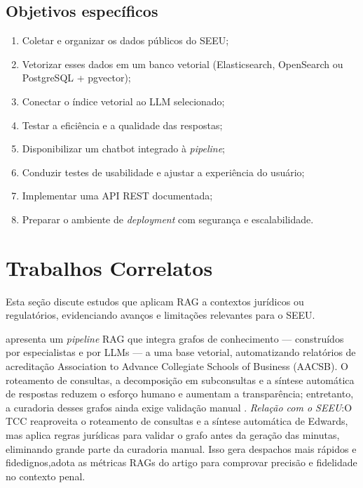 \subsection{Objetivos específicos}
\begin{enumerate}[label=\arabic*.]
  \item Coletar e organizar os dados públicos do SEEU;
  \item Vetorizar esses dados em um banco vetorial (Elasticsearch, OpenSearch
        ou PostgreSQL + pgvector);
  \item Conectar o índice vetorial ao LLM selecionado;
  \item Testar a eficiência e a qualidade das respostas;
  \item Disponibilizar um chatbot integrado à \emph{pipeline};
  \item Conduzir testes de usabilidade e ajustar a experiência do usuário;
  \item Implementar uma API REST documentada;
  \item Preparar o ambiente de \emph{deployment} com segurança e escalabilidade.
\end{enumerate}


\section{Trabalhos Correlatos}
\label{sec:trabalhos-correlatos}

Esta seção discute estudos que aplicam RAG a contextos jurídicos ou regulatórios, evidenciando avanços e limitações relevantes para o SEEU.

 apresenta um \textit{pipeline} RAG que integra grafos de conhecimento — construídos por especialistas e por LLMs — a uma base vetorial, automatizando relatórios de acreditação Association to Advance Collegiate Schools of Business (AACSB). O roteamento de consultas, a decomposição em subconsultas e a síntese automática de respostas reduzem o esforço humano e aumentam a transparência; entretanto, a curadoria desses grafos ainda exige validação manual \cite{edwards2024hybrid}.  
\emph{Relação com o SEEU}:O TCC reaproveita o roteamento de consultas e a síntese automática de Edwards, mas aplica regras jurídicas para validar o grafo antes da geração das minutas, eliminando grande parte da curadoria manual. Isso gera despachos mais rápidos e fidedignos,adota as métricas RAGs do artigo para comprovar precisão e fidelidade no contexto penal.

